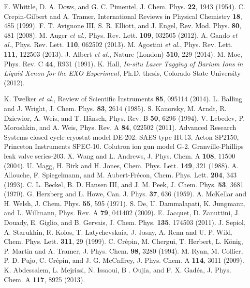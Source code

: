\documentclass[aps,pra,reprint,superscriptaddress]{revtex4-1}
\begin{document}
%
\begin{thebibliography}{00}

 E. Whittle, D. A. Dows, and G. C. Pimentel, J. Chem. Phys.  \textbf{22}, 1943 (1954).
 C. Crepin-Gilbert and A. Tramer, International Reviews in Physical Chemistry  \textbf{18}, 485 (1999).
 F. T. Avignone III, S. R. Elliott, and J. Engel, Rev. Mod. Phys.  \textbf{80}, 481 (2008).
 M. Auger \emph{ et al.}, Phys. Rev. Lett. \textbf{109}, 032505 (2012).
 A. Gando \emph{ et al.}, Phys. Rev. Lett. \textbf{110}, 062502 (2013).
 M. Agostini \emph{ et al.}, Phys. Rev. Lett. \textbf{111}, 122503 (2013).
 J. Albert \emph{ et al.},
Nature (London) \textbf{510}, 229 (2014).
 M. Moe, Phys. Rev. C \textbf{44}, R931 (1991).
 K. Hall, \emph{In-situ Laser Tagging of Barium Ions in Liquid Xenon for the EXO Experiment},
Ph.D. thesis, Colorado State University (2012).

 K. Twelker \emph{ et al.}, Review of Scientific Instruments \textbf{85}, 095114 (2014).
 L. Balling and J. Wright, J. Chem. Phys. \textbf{83}, 2614 (1985).
 S. Kanorsky, M. Arndt, R. Dziewior, A. Weis, and T. H\"{a}nsch, Phys. Rev. B \textbf{50}, 6296 (1994).
 V. Lebedev, P. Moroshkin, and A. Weis, Phys. Rev. A \textbf{84}, 022502 (2011).
 Advanced Research Systems closed cycle cryostat model DE-202.
 SAES type HU13.
 Acton SP2150, Princeton Instruments SPEC-10.
 Colutron ion gun model G-2.
 Granville-Phillips leak valve series-203.
 X. Wang and L. Andrews, J. Phys. Chem. A \textbf{108}, 11500 (2004).
 U. Magg, H. Birk and H. Jones, Chem. Phys. Lett. \textbf{149}, 321 (1988).
 A. Allouche, F. Spiegelmann, and M. Aubert-Fr\'{e}con,  Chem. Phys. Lett. \textbf{204}, 343 (1993).
 C. L. Beckel, B. D. Hansen III, and J. M. Peek, J. Chem. Phys. \textbf{53}, 3681 (1970).
 G. Herzberg and L. Howe, Can. J. Phys. \textbf{37}, 636 (1959).
 A. McKellar and H. Welsh, J. Chem. Phys. \textbf{55}, 595 (1971).
 S. De, U. Dammalapati, K. Jungmann, and L. Willmann, Phys. Rev. A \textbf{79}, 041402 (2009).
 E. Jacquet, D. Zanuttini, J. Douady, E. Giglio, and B. Gervais, J. Chem. Phys. \textbf{135}, 174503 (2011).
 J. Sepiol, A. Starukhin, R. Kolos, T. Latychevskaia, J. Jasny, A. Renn and U. P. Wild, Chem. Phys. Lett. \textbf{311}, 29 (1999).
 C. Cr\'{e}pin, M. Chergui, T. Herbert, L. K\"{o}nig, P. Martin and A. Tramer, J. Phys. Chem. \textbf{98}, 3280 (1994).
 M. Ryan, M. Collier, P. D. Pujo, C. Cr\'{e}pin, and J. G. McCaffrey, J. Phys. Chem. A \textbf{114}, 3011 (2009).
 K. Abdessalem, L. Mejrissi, N. Issaoui, B . Oujia, and F. X. Gad\'{e}a, J. Phys. Chem. A \textbf{117}, 8925 (2013).

\end{thebibliography}
\end{document}
